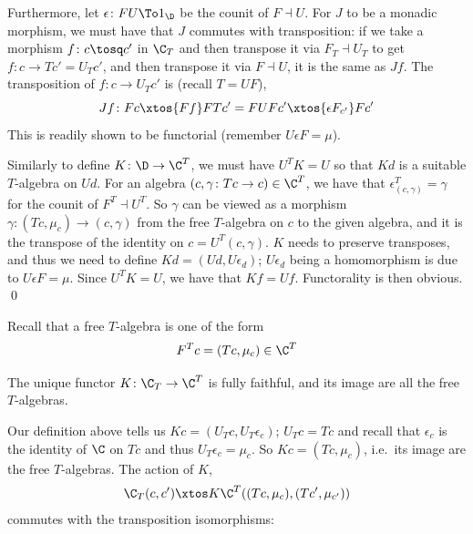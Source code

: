     Furthermore, let $\epsilon\colon FU\To1_\D$ be the counit of $F\dashv U$.
    For $J$ to be a monadic morphism, we must have that $J$ commutes with transposition: if we take a morphism $f\colon c\tosq c'$ in $\C_T$ and then transpose it via $F_T\dashv U_T$
    to get $f\colon c\to Tc'=U_Tc'$, and then transpose it via $F\dashv U$, it is the same as $Jf$.
    The transposition of $f\colon c\to U_Tc'$ is (recall $T=UF$),
    $$ Jf\colon Fc\xtos{Ff}FTc'=FUFc'\xtos{\epsilon F_{c'}}Fc' $$
    This is readily shown to be functorial (remember $U\epsilon F=\mu$).

    Similarly to define $K\colon\D\to\C^T$, we must have $U^TK=U$ so that $Kd$ is a suitable $T$-algebra on $Ud$.
    For an algebra $(c,\gamma\colon Tc\to c)\in\C^T$, we have that $\epsilon^T_{(c,\gamma)}=\gamma$ for the counit of $F^T\dashv U^T$.
    So $\gamma$ can be viewed as a morphism $\gamma\colon(Tc,\mu_c)\to(c,\gamma)$ from the free $T$-algebra on $c$ to the given algebra, and it is the transpose of the identity on $c=U^T(c,\gamma)$.
    $K$ needs to preserve transposes, and thus we need to define $Kd=(Ud,U\epsilon_d)$; $U\epsilon_d$ being a homomorphism is due to $U\epsilon F=\mu$.
    Since $U^TK=U$, we have that $Kf=Uf$.
    Functorality is then obvious.
    \qed

\eproof

Recall that a {\emphcolor free $T$-algebra} is one of the form
$$ F^Tc = (Tc,\mu_c) \in \C^T $$

\blemm

    The unique functor $K\colon\C_T\to\C^T$ is fully faithful, and its image are all the free $T$-algebras.

\elemm

\bproof

    Our definition above tells us $Kc=(U_Tc,U_T\epsilon_c)$; $U_Tc=Tc$ and recall that $\epsilon_c$ is the identity of $\C$ on $Tc$ and thus $U_T\epsilon_c=\mu_c$.
    So $Kc=(Tc,\mu_c)$, i.e.\ its image are the free $T$-algebras.
    The action of $K$,
    $$ \C_T(c,c') \xtos K \C^T((Tc,\mu_c),(Tc',\mu_{c'})) $$
    commutes with the transposition isomorphisms:

    \centerline{}

